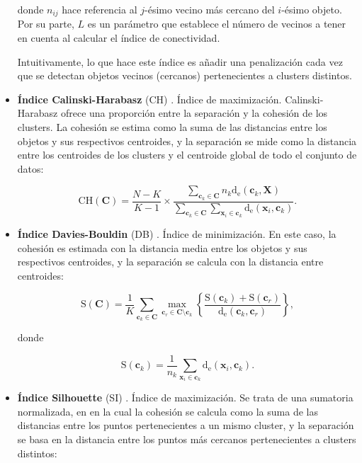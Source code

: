 \begin{itemize}
	donde $n_{ij}$ hace referencia al $j$-ésimo vecino más cercano del $i$-ésimo objeto. Por su parte, $L$ es un parámetro que establece el número de vecinos a tener en cuenta al calcular el índice de conectividad.
	
	Intuitivamente, lo que hace este índice es añadir una penalización cada vez que se detectan objetos vecinos (cercanos) pertenecientes a clusters distintos.
	
	\item \textbf{Índice Calinski-Harabasz} (CH) \cite{calinski1974dendrite}. Índice de maximización. Calinski-Harabasz ofrece una proporción entre la separación y la cohesión  de los clusters. La cohesión se estima como la suma de las distancias entre los objetos y sus respectivos centroides, y la separación se mide como la distancia entre los centroides de los clusters y el centroide global de todo el conjunto de datos:
	
	\begin{equation}
		\text{CH}(\textbf{C}) = \frac{N-K}{K-1} \times \frac{\sum_{\textbf{c}_k \in \textbf{C}} n_k \text{d}_{\text{e}}(\textbf{\=c}_k, \textbf{\=X})}{\sum_{\textbf{c}_k \in \textbf{C}} \sum_{\textbf{x}_i \in \textbf{c}_k} \text{d}_{\text{e}}(\textbf{x}_i, \textbf{\=c}_k)}.
	\end{equation}
	
	\item \textbf{Índice Davies-Bouldin} (DB) \cite{davies1979cluster}. Índice de minimización. En este caso, la cohesión es estimada con la distancia media entre los objetos y sus respectivos centroides, y la separación se calcula con la distancia entre centroides:
	
	\begin{equation}\label{eq:db}
		\text{S}(\textbf{C}) = \frac{1}{K} \sum_{\textbf{c}_k \in \textbf{C}} \max_{\textbf{c}_r \in \textbf{C} \setminus \textbf{c}_k} \left\{\frac{\text{S}(\textbf{c}_k) + \text{S}(\textbf{c}_r)}{\text{d}_{\text{e}}(\textbf{\=c}_k,\textbf{\=c}_r)}\right\},
	\end{equation}
	
	donde
	
	\begin{equation}
	\text{S}(\textbf{c}_k) = \frac{1}{n_k} \sum_{\textbf{x}_i \in \textbf{c}_k} \text{d}_\text{e}(\textbf{x}_i,\textbf{\=c}_k).
	\end{equation}
	
	\item \textbf{Índice Silhouette} (SI) \cite{rousseeuw1987silhouettes}. Índice de maximización. Se trata de una sumatoria normalizada, en en la cual la cohesión se calcula como la suma de las distancias entre los puntos pertenecientes a un mismo cluster, y la separación se basa en la distancia entre los puntos más cercanos pertenecientes a clusters distintos:
	

\end{itemize}
